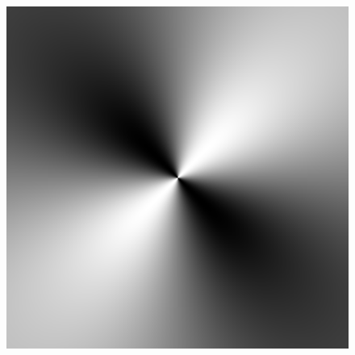 \begin{figure}
{ }
 \hfill
 \subtop
 {
 \includegraphics[scale=0.25]{figures/unified_dfilt_wur_sqrt2.png}
}
\end{figure}

